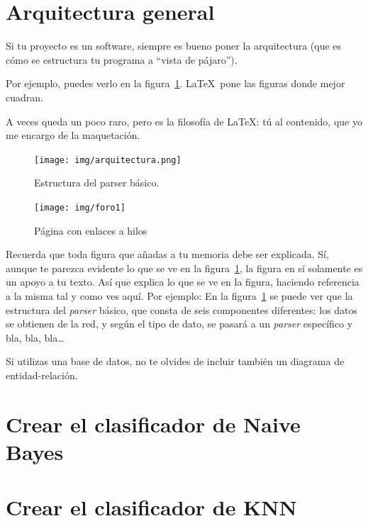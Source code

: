 \documentclass[a4paper, 12pt]{book}
\begin{document}
\section{Arquitectura general} 
\label{sec:arquitectura}

Si tu proyecto es un software, siempre es bueno poner la arquitectura (que es cómo se estructura tu programa a ``vista de pájaro'').

Por ejemplo, puedes verlo en la figura~\ref{fig:arquitectura}.
\LaTeX \ pone las figuras donde mejor cuadran. 

A veces queda un poco raro, pero es la filosofía de \LaTeX: tú al contenido, que yo me encargo de la maquetación.

\begin{figure}
  \centering
  \texttt{[image: img/arquitectura.png]}
  \caption{Estructura del parser básico.}\label{fig:arquitectura}
\end{figure}

\begin{figure}
    \centering
    \texttt{[image: img/foro1]}
    \caption{Página con enlaces a hilos}\label{fig:_arquitectura}
\end{figure}

 
Recuerda que toda figura que añadas a tu memoria debe ser explicada.
Sí, aunque te parezca evidente lo que se ve en la figura~\ref{fig:arquitectura}, la figura en sí solamente es un apoyo a tu texto.
Así que explica lo que se ve en la figura, haciendo referencia a la misma tal y como ves aquí.
Por ejemplo: En la figura~\ref{fig:arquitectura} se puede ver que la estructura del \emph{parser} básico, que consta de seis componentes diferentes: los datos se obtienen de la red, y según el tipo de dato, se pasará a un \emph{parser} específico y bla, bla, bla\ldots

Si utilizas una base de datos, no te olvides de incluir también un diagrama de entidad-relación.

\section{Crear el clasificador de Naive Bayes} 
\label{sec:naivebayes}



\section{Crear el clasificador de KNN} 
\label{sec:knn}
\end{document}
